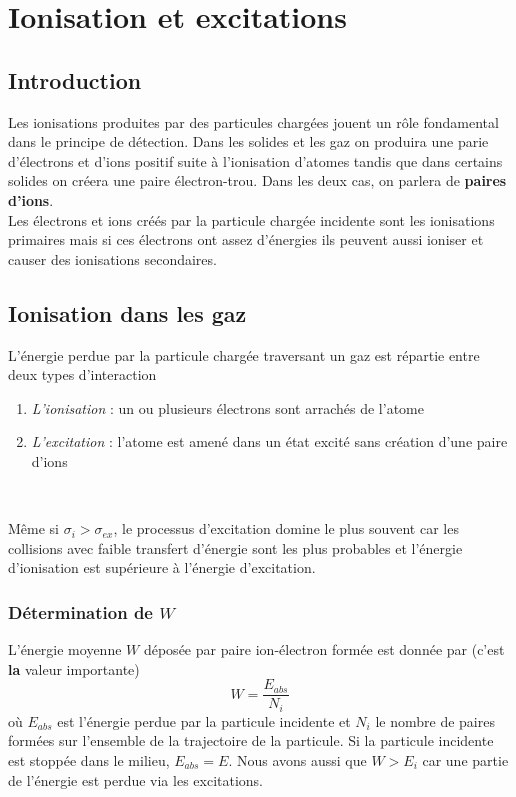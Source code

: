 \chapter{Ionisation et excitations}
\section{Introduction}
Les ionisations produites par des particules chargées jouent un rôle fondamental dans le principe
de détection. Dans les solides et les gaz on produira une parie d'électrons et d'ions positif suite
à l'ionisation d'atomes tandis que dans certains solides on créera une paire électron-trou. Dans
les deux cas, on parlera de \textbf{paires d'ions}.\\

Les électrons et ions créés par la particule chargée incidente sont les ionisations primaires mais
si ces électrons ont assez d'énergies ils peuvent aussi ioniser et causer des ionisations secondaires.

\section{Ionisation dans les gaz}%
L'énergie perdue par la particule chargée traversant un gaz est répartie entre deux types 
d'interaction
\begin{enumerate}
\item \textit{L'ionisation} : un ou plusieurs électrons sont arrachés de l'atome
\item \textit{L'excitation} : l'atome est amené dans un état excité sans création d'une paire d'ions
\end{enumerate}\ 

Même si $\sigma_i>\sigma_{ex}$, le processus d'excitation domine le plus souvent car les collisions
avec faible transfert d'énergie sont les plus probables et l'énergie d'ionisation est supérieure à 
l'énergie d'excitation.

\subsection{Détermination de $W$}%
L'énergie moyenne $W$ déposée par paire ion-électron formée est donnée par (c'est \textbf{la} valeur 
importante)
\begin{equation}
W=\frac{E_{abs}}{N_i}
\end{equation}
où $E_{abs}$ est l'énergie perdue par la particule incidente et $N_i$ le nombre de paires formées
sur l'ensemble de la trajectoire de la particule. Si la particule incidente est stoppée dans le 
milieu, $E_{abs}=E$. Nous avons aussi que $W>E_i$ car une partie de l'énergie est perdue via les
excitations.\\

